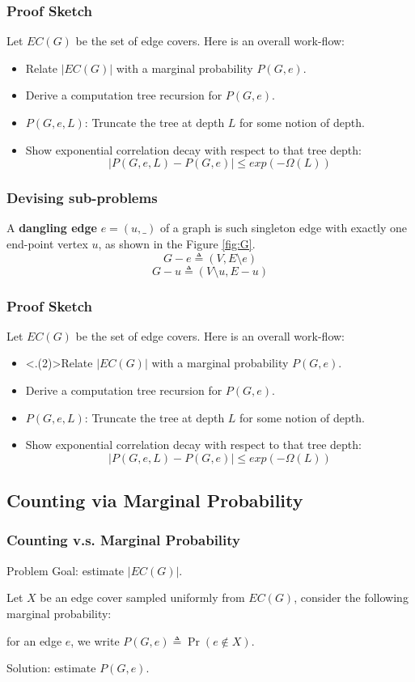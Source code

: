 \documentclass[mathserif]{beamer}
\newcommand{\abs}[1]{\left\vert#1\right\vert}
\begin{document}
\begin{frame}
	\frametitle{Proof Sketch}
Let $EC(G)$ be the set of edge covers.
Here is an overall work-flow:
\begin{itemize}
  \item Relate $\abs{EC(G)}$ with a marginal probability $P(G,e)$.
  \item Derive a computation tree recursion for $P(G,e)$.
  \item $P(G,e,L)$: Truncate the tree at depth $L$ for some notion of depth.
  \item{ Show exponential correlation decay with respect to that tree depth:
  \[
    \abs{ P(G,e,L) - P(G,e) } \leq exp(-\Omega(L))
  \]}
\end{itemize}
\end{frame}

\begin{frame}
	\frametitle{Devising sub-problems} %

\begin{definition}
	A {\bf dangling edge} $e=(u,\_)$ of a graph is such singleton edge with exactly one end-point vertex $u$, as shown in the Figure \ref{fig:G}.
\[ G - e \triangleq \left(V, E \setminus e\right) \]
\[ G - u \triangleq \left(V \setminus u, E - u\right) \]
\end{definition}

\end{frame}

\begin{frame}
	\frametitle{Proof Sketch}
Let $EC(G)$ be the set of edge covers.
Here is an overall work-flow:
\begin{itemize}
  \item \alert<.(2)>{Relate $\abs{EC(G)}$ with a marginal probability $P(G,e)$.}
  \item Derive a computation tree recursion for $P(G,e)$.
  \item $P(G,e,L)$: Truncate the tree at depth $L$ for some notion of depth.
  \item{ Show exponential correlation decay with respect to that tree depth:
  \[
    \abs{ P(G,e,L) - P(G,e) } \leq exp(-\Omega(L))
  \]}
\end{itemize}

\end{frame}

\subsection{Counting via Marginal Probability}
\begin{frame}
	\frametitle{Counting v.s. Marginal Probability}
	\begin{block}{Problem}
	Goal: estimate $\abs{EC(G)}$.
	\end{block}
	
	Let $X$ be an edge cover sampled uniformly from $EC(G)$, consider the following marginal probability:

	for an edge $e$, we write $P(G,e) \triangleq \Pr ( e \notin X)$.

	\bigskip

	Solution: estimate $P(G,e)$.
\end{frame}
\end{document}
